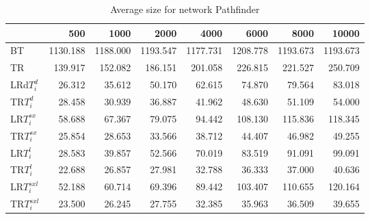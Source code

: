 \begin{table}
\begin{center}
\begin{tabular}{lrrrrrrr}
 & 500 &  1000 & 2000 & 4000 & 6000& 8000&  10000\\\hline
BT & 1130.188 & 1188.000 & 1193.547 & 1177.731 & 1208.778 & 1193.673 & 1193.673\\\hline
TR & 139.917 & 152.082 & 186.151 & 201.058 & 226.815 & 221.527 & 250.709\\\hline
LRd$T_i^d$ & 26.312 & 35.612 & 50.170 & 62.615 & 74.870 & 79.564 & 83.018\\\hline
TR$T_i^d$ & 28.458 & 30.939 & 36.887 & 41.962 & 48.630 & 51.109 & 54.000\\\hline
LR$T_i^{sx}$ & 58.688 & 67.367 & 79.075 & 94.442 & 108.130 & 115.836 & 118.345\\\hline
TR$T_i^{sx}$ & 25.854 & 28.653 & 33.566 & 38.712 & 44.407 & 46.982 & 49.255\\\hline
LR$T_i^l$ & 28.583 & 39.857 & 52.566 & 70.019 & 83.519 & 91.091 & 99.091\\\hline
TR$T_i^l$ & 22.688 & 26.857 & 27.981 & 32.788 & 36.333 & 37.000 & 40.636\\\hline
LR$T_i^{sxl}$ & 52.188 & 60.714 & 69.396 & 89.442 & 103.407 & 110.655 & 120.164\\\hline
TR$T_i^{sxl}$ & 23.500 & 26.245 & 27.755 & 32.385 & 35.963 & 36.509 & 39.655\\\hline
\end{tabular}
\end{center}
\caption{Average size for network Pathfinder }
\label{Pathfindersi}
\end{table}

